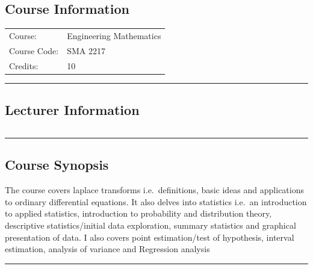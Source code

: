
\subsection*{Course Information}\label{course:sma2116}
\vspace{0ex}%
\noindent\parbox{0.5\textwidth}{%
    \noindent\begin{tabular}{@{}ll}
                 \textsf{Course:}          & 	Engineering Mathematics \Romannum{3}\\
                 \textsf{Course Code:}         & 	SMA 2217    \\
                 \textsf{Credits:}    & 	10
    \end{tabular}}
\vspace{2ex}\hrule\vspace{2ex}

\subsection*{Lecturer Information}
\noindent\parbox{0.5\textwidth}{%
    \noindent\begin{tabular}{@{}ll}
                 
    \end{tabular}}
\vspace{2ex}\hrule\vspace{2ex}


\subsection*{Course Synopsis}
The course covers laplace transforms i.e.\ definitions, basic ideas and applications to ordinary differential equations.
It also delves into statistics i.e.\ an introduction to applied statistics, introduction to probability and distribution theory, descriptive statistics/initial data exploration, summary statistics and graphical presentation of data.
I also covers point estimation/test of hypothesis, interval  estimation, analysis of variance and Regression analysis
\vspace{2ex} \hrule\vspace{2ex}


